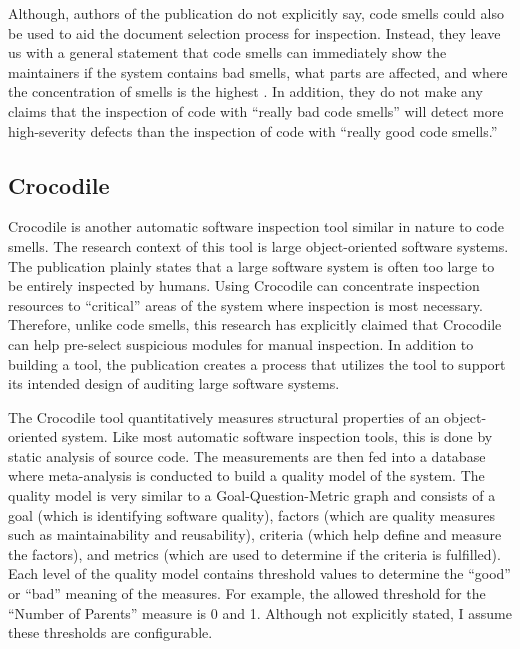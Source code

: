 Although, authors of the publication \cite{vanEmden02} do not explicitly
say, code smells could also be used to aid the document selection process
for inspection. Instead, they leave us with a general statement that code
smells can immediately show the maintainers if the system contains bad
smells, what parts are affected, and where the concentration of smells is
the highest \cite{vanEmden02}. In addition, they do not make any claims
that the inspection of code with ``really bad code smells'' will detect
more high-severity defects than the inspection of code with ``really good
code smells.''

\subsection{Crocodile}
Crocodile \cite{KohlerRS98} is another automatic software inspection tool
similar in nature to code smells. The research context of this tool is
large object-oriented software systems. The publication \cite{KohlerRS98}
plainly states that a large software system is often too large to be
entirely inspected by humans. Using Crocodile can concentrate inspection
resources to ``critical'' areas of the system where inspection is most
necessary. Therefore, unlike code smells, this research has explicitly
claimed that Crocodile can help pre-select suspicious modules for manual
inspection. In addition to building a tool, the publication
\cite{KohlerRS98} creates a process that utilizes the tool to support its
intended design of auditing large software systems.

The Crocodile tool quantitatively measures structural properties of an
object-oriented system. Like most automatic software inspection tools, this
is done by static analysis of source code. The measurements are then fed
into a database where meta-analysis is conducted to build a quality model
of the system. The quality model is very similar to a Goal-Question-Metric
graph and consists of a goal (which is identifying software quality),
factors (which are quality measures such as maintainability and
reusability), criteria (which help define and measure the factors), and
metrics (which are used to determine if the criteria is fulfilled). Each
level of the quality model contains threshold values to determine the
``good'' or ``bad'' meaning of the measures. For example, the allowed
threshold for the ``Number of Parents'' measure is 0 and 1. Although not
explicitly stated, I assume these thresholds are configurable.

